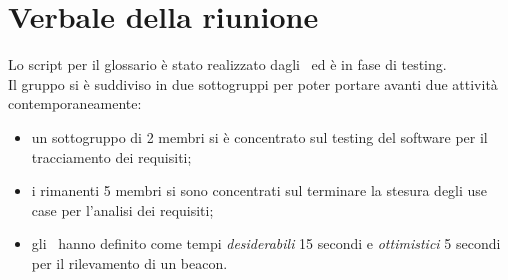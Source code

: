 \documentclass[../Riunione16-01-13.tex]{subfiles}
\begin{document}
\section{Verbale della riunione}
Lo script per il glossario è stato realizzato dagli \amministratori\ ed è in fase di testing. \\
Il gruppo si è suddiviso in due sottogruppi per poter portare avanti due attività contemporaneamente:
\begin{itemize}
	\item un sottogruppo di 2 membri si è concentrato sul testing del software per il tracciamento dei requisiti;
	\item i rimanenti 5 membri si sono concentrati sul terminare la stesura degli use case per l'analisi dei requisiti;
	\item gli \analisti\ hanno definito come tempi \textit{desiderabili} 15 secondi e \textit{ottimistici} 5 secondi per il rilevamento di un beacon.
\end{itemize}
\end{document}
